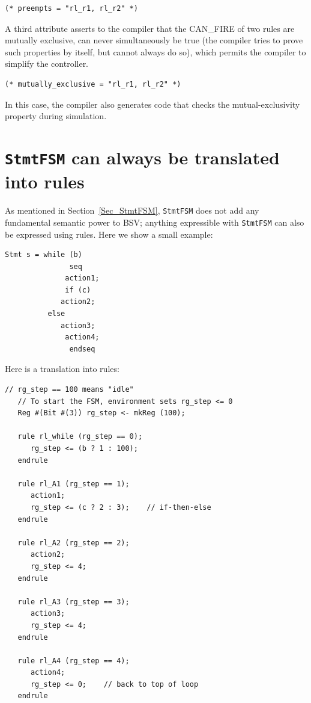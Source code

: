 {\footnotesize
\begin{Verbatim}[frame=single,label=BSV]
(* preempts = "rl_r1, rl_r2" *)
\end{Verbatim}
}

A third attribute asserts to the compiler that the CAN\_FIRE of two
rules are mutually exclusive, {\ie} can never simultaneously be true
(the compiler tries to prove such properties by itself, but cannot
always do so), which permits the compiler to simplify the controller.

{\footnotesize
\begin{Verbatim}[frame=single,label=BSV]
(* mutually_exclusive = "rl_r1, rl_r2" *)
\end{Verbatim}
}

In this case, the compiler also generates code that checks the
mutual-exclusivity property during simulation.


\section{{\tt StmtFSM} can always be translated into rules}

\label{Sec_StmtFSM_translation_into_rules}


As mentioned in Section~\ref{Sec_StmtFSM}, \verb|StmtFSM| does not add
any fundamental semantic power to BSV; anything expressible with
\verb|StmtFSM| can also be expressed using rules.  
Here we show a small example:

{\footnotesize
\begin{Verbatim}[frame=single,label=BSV]
   Stmt s = while (b)
               seq
	          action1;
	          if (c)
		     action2;
		  else
		     action3;
	          action4;
               endseq
\end{Verbatim}
}

Here is a translation into rules:

{\footnotesize
\begin{Verbatim}[frame=single,label=BSV]
   // rg_step == 100 means "idle"
   // To start the FSM, environment sets rg_step <= 0
   Reg #(Bit #(3)) rg_step <- mkReg (100);

   rule rl_while (rg_step == 0);
      rg_step <= (b ? 1 : 100);
   endrule

   rule rl_A1 (rg_step == 1);
      action1;
      rg_step <= (c ? 2 : 3);    // if-then-else
   endrule

   rule rl_A2 (rg_step == 2);
      action2;
      rg_step <= 4;
   endrule

   rule rl_A3 (rg_step == 3);
      action3;
      rg_step <= 4;
   endrule

   rule rl_A4 (rg_step == 4);
      action4;
      rg_step <= 0;    // back to top of loop
   endrule
\end{Verbatim}
}

